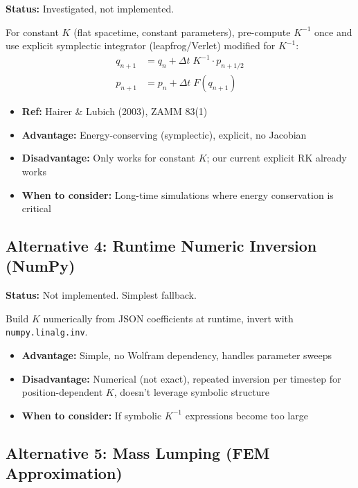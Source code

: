 \textbf{Status:} Investigated, not implemented.

For constant $K$ (flat spacetime, constant parameters), pre-compute $K^{-1}$ once and use explicit symplectic integrator (leapfrog/Verlet) modified for $K^{-1}$:
\begin{align}
  q_{n+1}   &= q_n + \Delta t\; K^{-1} \cdot p_{n+1/2} \label{eq:symplectic-q} \\
  p_{n+1}   &= p_n + \Delta t\; F(q_{n+1}) \label{eq:symplectic-p}
\end{align}

\begin{itemize}
  \item \textbf{Ref:} Hairer \& Lubich (2003), ZAMM 83(1)
  \item \textbf{Advantage:} Energy-conserving (symplectic), explicit, no Jacobian
  \item \textbf{Disadvantage:} Only works for constant $K$; our current explicit RK already works
  \item \textbf{When to consider:} Long-time simulations where energy conservation is critical
\end{itemize}


\subsection{Alternative 4: Runtime Numeric Inversion (NumPy)}
\label{sec:kinetic-alt4}

\textbf{Status:} Not implemented. Simplest fallback.

Build $K$ numerically from JSON coefficients at runtime, invert with \texttt{numpy.linalg.inv}.

\begin{itemize}
  \item \textbf{Advantage:} Simple, no Wolfram dependency, handles parameter sweeps
  \item \textbf{Disadvantage:} Numerical (not exact), repeated inversion per timestep for position-dependent $K$, doesn't leverage symbolic structure
  \item \textbf{When to consider:} If symbolic $K^{-1}$ expressions become too large
\end{itemize}


\subsection{Alternative 5: Mass Lumping (FEM Approximation)}
\label{sec:kinetic-alt5}

